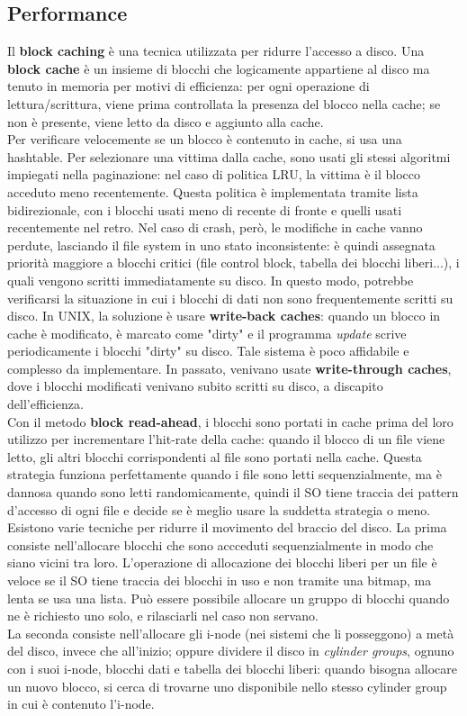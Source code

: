 \documentclass[12pt]{article}
\begin{document}
\subsection{Performance}
Il \textbf{block caching} è una tecnica utilizzata per ridurre l'accesso a disco. Una \textbf{block cache} è un insieme 
di blocchi che logicamente appartiene al disco ma tenuto in memoria per motivi di efficienza: per ogni operazione
di lettura/scrittura, viene prima controllata la presenza del blocco nella cache; se non è presente, viene letto da
disco e aggiunto alla cache.\\
Per verificare velocemente se un blocco è contenuto in cache, si usa una hashtable. 
Per selezionare una vittima dalla cache, sono usati gli stessi algoritmi impiegati nella paginazione: nel caso di politica
LRU, la vittima è il blocco acceduto meno recentemente. Questa politica è implementata tramite lista bidirezionale, con
i blocchi usati meno di recente di fronte e quelli usati recentemente nel retro. Nel caso di crash, però, le modifiche 
in cache vanno perdute, lasciando il file system in uno stato inconsistente: è quindi assegnata priorità maggiore a
blocchi critici (file control block, tabella dei blocchi liberi...), i quali vengono scritti immediatamente su disco.
In questo modo, potrebbe verificarsi la situazione in cui i blocchi di dati non sono frequentemente scritti su disco. In
UNIX, la soluzione è usare \textbf{write-back caches}: quando un blocco in cache è modificato, è marcato come "dirty" e 
il programma \textit{update} scrive periodicamente i blocchi "dirty" su disco. Tale sistema è poco affidabile e complesso
da implementare. In passato, venivano usate \textbf{write-through caches}, dove i blocchi modificati venivano subito
scritti su disco, a discapito dell'efficienza.\\
Con il metodo \textbf{block read-ahead}, i blocchi sono portati in cache prima del loro utilizzo per incrementare 
l'hit-rate della cache: quando il blocco di un file viene letto, gli altri blocchi corrispondenti al file sono portati 
nella cache. Questa strategia funziona perfettamente quando i file sono letti sequenzialmente, ma è dannosa quando sono
letti randomicamente, quindi il SO tiene traccia dei pattern d'accesso di ogni file e decide se è meglio usare la 
suddetta strategia o meno.\\
Esistono varie tecniche per ridurre il movimento del braccio del disco. La prima consiste nell'allocare blocchi che
sono accceduti sequenzialmente in modo che siano vicini tra loro. L'operazione di allocazione dei blocchi liberi per un
file è veloce se il SO tiene traccia dei blocchi in uso e non tramite una bitmap, ma lenta se usa una lista. Può essere
possibile allocare un gruppo di blocchi quando ne è richiesto uno solo, e rilasciarli nel caso non servano.\\
La seconda consiste nell'allocare gli i-node (nei sistemi che li posseggono) a metà del disco, invece che all'inizio;
oppure dividere il disco in \textit{cylinder groups}, ognuno con i suoi i-node, blocchi dati e tabella dei blocchi
liberi: quando bisogna allocare un nuovo blocco, si cerca di trovarne uno disponibile nello stesso cylinder group in cui
è contenuto l'i-node.
\end{document}
